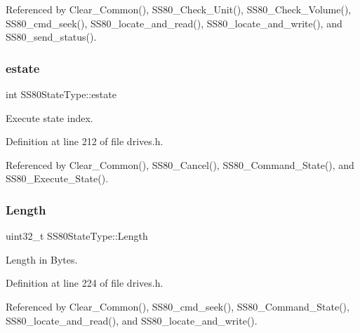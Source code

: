 Referenced by Clear\+\_\+\+Common(), S\+S80\+\_\+\+Check\+\_\+\+Unit(), S\+S80\+\_\+\+Check\+\_\+\+Volume(), S\+S80\+\_\+cmd\+\_\+seek(), S\+S80\+\_\+locate\+\_\+and\+\_\+read(), S\+S80\+\_\+locate\+\_\+and\+\_\+write(), and S\+S80\+\_\+send\+\_\+status().

\mbox{\label{structSS80StateType_ae4a94143cb4201687be4e33684be057e}} 
\subsubsection{\texorpdfstring{estate}{estate}}
{\footnotesize\ttfamily int S\+S80\+State\+Type\+::estate}



Execute state index. 



Definition at line 212 of file drives.\+h.



Referenced by Clear\+\_\+\+Common(), S\+S80\+\_\+\+Cancel(), S\+S80\+\_\+\+Command\+\_\+\+State(), and S\+S80\+\_\+\+Execute\+\_\+\+State().

\mbox{\label{structSS80StateType_a507159f0a0a4f3127488081fd618e8f6}} 
\subsubsection{\texorpdfstring{Length}{Length}}
{\footnotesize\ttfamily uint32\+\_\+t S\+S80\+State\+Type\+::\+Length}



Length in Bytes. 



Definition at line 224 of file drives.\+h.



Referenced by Clear\+\_\+\+Common(), S\+S80\+\_\+cmd\+\_\+seek(), S\+S80\+\_\+\+Command\+\_\+\+State(), S\+S80\+\_\+locate\+\_\+and\+\_\+read(), and S\+S80\+\_\+locate\+\_\+and\+\_\+write().

\mbox{\label{structSS80StateType_ad4911c7b89ec1ff2c0aa01881b1e3d3a}} 
